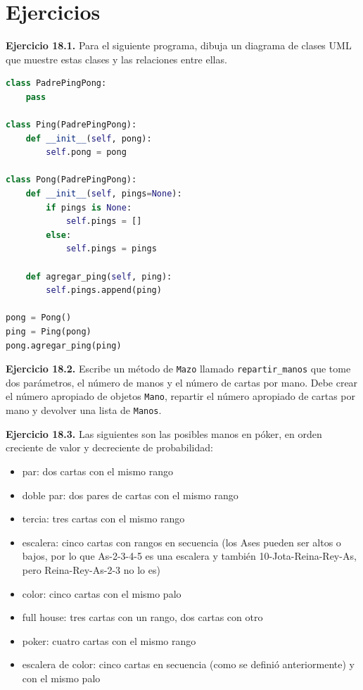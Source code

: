 \section{Ejercicios}

\textbf{Ejercicio 18.1.} Para el siguiente programa, dibuja un diagrama de clases UML que muestre estas clases y las relaciones entre ellas.

\begin{lstlisting}[language=Python]
class PadrePingPong:
    pass

class Ping(PadrePingPong):
    def __init__(self, pong):
        self.pong = pong

class Pong(PadrePingPong):
    def __init__(self, pings=None):
        if pings is None:
            self.pings = []
        else:
            self.pings = pings

    def agregar_ping(self, ping):
        self.pings.append(ping)

pong = Pong()
ping = Ping(pong)
pong.agregar_ping(ping)
\end{lstlisting}

\textbf{Ejercicio 18.2.} Escribe un método de \texttt{Mazo} llamado \texttt{repartir\_manos} que tome dos parámetros, el número de manos y el número de cartas por mano. Debe crear el número apropiado de objetos \texttt{Mano}, repartir el número apropiado de cartas por mano y devolver una lista de \texttt{Manos}.

\textbf{Ejercicio 18.3.} Las siguientes son las posibles manos en póker, en orden creciente de valor y decreciente de probabilidad:

\begin{itemize}
    \item par: dos cartas con el mismo rango
    \item doble par: dos pares de cartas con el mismo rango
    \item tercia: tres cartas con el mismo rango
    \item escalera: cinco cartas con rangos en secuencia (los Ases pueden ser altos o bajos, por lo que As-2-3-4-5 es una escalera y también 10-Jota-Reina-Rey-As, pero Reina-Rey-As-2-3 no lo es)
    \item color: cinco cartas con el mismo palo
    \item full house: tres cartas con un rango, dos cartas con otro
    \item poker: cuatro cartas con el mismo rango
    \item escalera de color: cinco cartas en secuencia (como se definió anteriormente) y con el mismo palo
\end{itemize}

